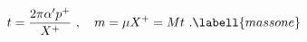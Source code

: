 \begin{equation}
  \quad t = \frac{2\pi\alpha' p^+}{X^+}\ ,
  \quad {m}=\mu X^+   =Mt\ .
\labell{massone}
\end{equation}

